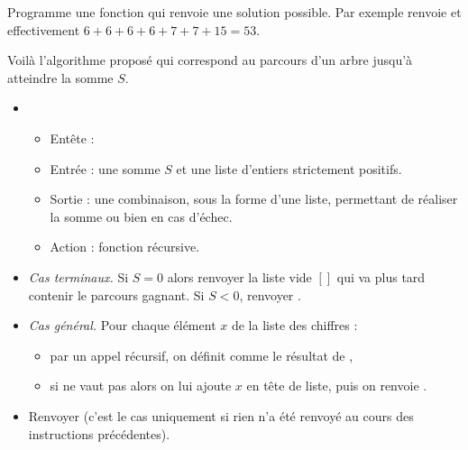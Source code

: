 \documentclass[11pt,class=report,crop=false]{standalone}
\begin{document}
\begin{activite}

     
    Programme une fonction  qui renvoie une solution possible.
    Par exemple  renvoie \ci{[6,6,6,6,7,7,15]}
    et effectivement $6 + 6 + 6 + 6 + 7 + 7 + 15 = 53$.
     
    Voilà l'algorithme proposé qui correspond au parcours d'un arbre jusqu'à atteindre la somme $S$.
\begin{algorithme}
\sauteligne 
  
\begin{itemize}
  \item 
  \begin{itemize}
   \item Entête : 
   \item Entrée : une somme $S$ et une liste d'entiers strictement positifs.
   
   \item Sortie : une combinaison, sous la forme d'une liste, permettant de réaliser la somme ou bien  en cas d'échec.
 
   \item Action : fonction récursive.
  \end{itemize}

   \item \emph{Cas terminaux.} Si $S=0$  alors renvoyer la liste vide $[]$ qui va plus tard contenir le parcours gagnant. Si $S<0$, renvoyer .
   
   \item \emph{Cas général.}
   Pour chaque élément $x$ de la liste des chiffres :
    \begin{itemize}
      \item par un appel récursif, on définit  comme le résultat de 
      ,
      \item si  ne vaut pas  alors on lui ajoute $x$ en tête de liste, puis on renvoie .
    \end{itemize}
    
    \item Renvoyer  (c'est le cas uniquement si rien n'a été renvoyé au cours des instructions précédentes). 
  \end{itemize}
 \end{algorithme}     
  

\end{activite}
\end{document}
